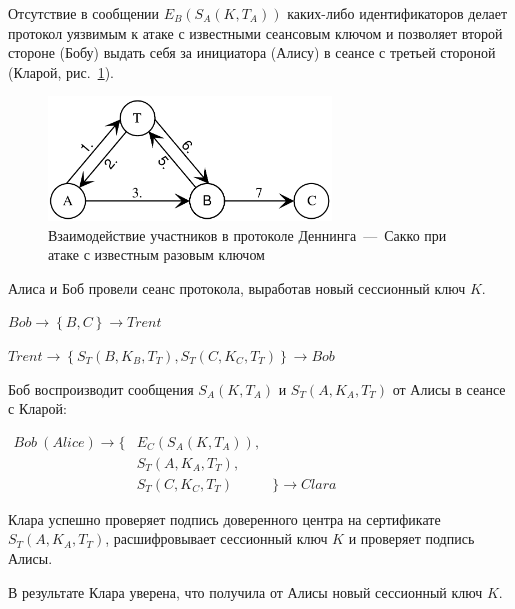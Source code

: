 Отсутствие в сообщении $E_B( S_A ( K, T_A ) )$ каких-либо идентификаторов делает протокол уязвимым к атаке с известными сеансовым ключом и позволяет второй стороне (Бобу) выдать себя за инициатора (Алису) в сеансе с третьей стороной (Кларой, рис.~\ref{fig:denning-sacco-attack}).

\begin{figure}
    \centering
    \includegraphics[width=0.67\textwidth]{pic/denning-sacco-attack}
    \caption{Взаимодействие участников в протоколе Деннинга~---~Сакко при атаке с известным разовым ключом\label{fig:denning-sacco-attack}}
\end{figure}

\begin{protocol}
    \item[(1)--(4)] Алиса и Боб провели сеанс протокола, выработав новый сессионный ключ $K$.
    \item[(5)] $Bob \to \left\{ B, C \right\} \to Trent$
    \item[(6)] $Trent \to \left\{ S_T( B, K_B, T_T ), S_T( C, K_C, T_T ) \right\} \to Bob$
	\item[(7)] Боб воспроизводит сообщения $S_A ( K, T_A )$ и $S_T( A, K_A, T_T )$ от Алисы в сеансе с Кларой:
    \item[{}] $\begin{array}{lll}
Bob~(Alice) \to \{ & E_C( S_A ( K, T_A ) ), & \\ 
             & S_T( A, K_A, T_T ),    & \\ 
             & S_T( C, K_C, T_T )     & \} \to Clara
\end{array}$
	\item[(8)] Клара успешно проверяет подпись доверенного центра на сертификате $S_T( A, K_A, T_T )$, расшифровывает сессионный ключ $K$ и проверяет подпись Алисы.
\end{protocol}

В результате Клара уверена, что получила от Алисы новый сессионный ключ $K$.

